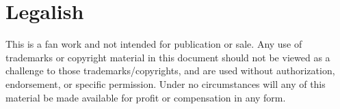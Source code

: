 \section{Legalish}
\begin{centering}
This is a fan work and not intended for publication or sale.
Any use of trademarks or copyright material in this document should not be viewed as a challenge to
those trademarks/copyrights, and are used without authorization, endorsement, or specific permission.
Under no circumstances will any of this material be made available for profit or compensation in any form.
\end{centering}

